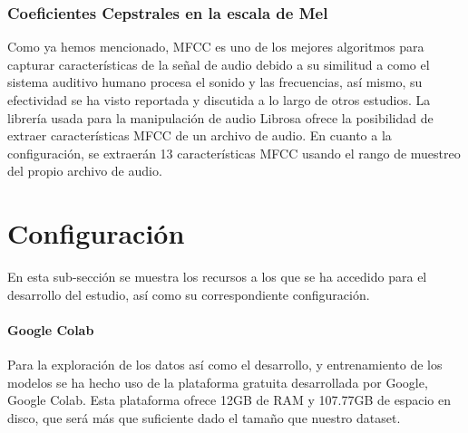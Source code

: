 \documentclass[11pt,a4paper,spanish]{book}
\begin{document}
	\subsubsection{Coeficientes Cepstrales en la escala de Mel}
	Como ya hemos mencionado, MFCC es uno de los mejores algoritmos para capturar características de la señal de audio debido a su similitud a como el sistema auditivo humano procesa el sonido y las frecuencias, así mismo, su efectividad se ha visto reportada y discutida a lo largo de otros estudios.
	La librería usada para la manipulación de audio Librosa ofrece la posibilidad de extraer características MFCC de un archivo de audio. En cuanto a la configuración, se extraerán 13 características MFCC usando el rango de muestreo del propio archivo de audio.

	

	\section{Configuración}
	En esta sub-sección se muestra los recursos a los que se ha accedido para el desarrollo del estudio, así como su correspondiente configuración.

	
	
	\paragraph{Google Colab} Para la exploración de los datos así como el desarrollo, y entrenamiento de los modelos se ha hecho uso de la plataforma gratuita desarrollada por Google, Google Colab. Esta plataforma ofrece 12GB de RAM  y 107.77GB de espacio en disco, que será más que suficiente dado el tamaño que nuestro dataset.
	
\end{document}
